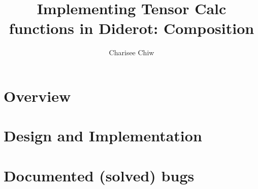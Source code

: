 \documentclass{article}
\title{Implementing Tensor Calc functions in Diderot: Composition}
\author{Charisee Chiw}
\begin{document}
\maketitle 

\section{Overview}


\section{Design and Implementation}

\section{Documented (solved) bugs}







 
\end{document}
